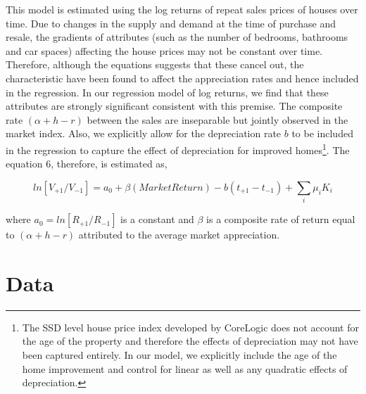 \documentclass[AEJ,reqno, draftmode]{AEA} %
\begin{document}
This model is estimated using the log returns of repeat sales prices of houses over time. Due to changes in the supply and demand at the time of purchase and resale, the gradients of attributes (such as the number of bedrooms, bathrooms and car spaces) affecting the house prices may not be constant over time. Therefore, although the equations suggests that these cancel out, the characteristic have been found to affect the appreciation rates \citep{kiel1995effect} and hence included in the regression. In our regression model of log returns, we find that these attributes are strongly significant consistent with this premise. The composite rate $(\alpha+h-r)$ between the sales are inseparable but jointly observed in the market index. Also, we explicitly allow for the depreciation rate $b$ to be included in the regression to capture the effect of depreciation for improved homes\footnote{The SSD level house price index developed by CoreLogic does not account for the age of the property and therefore the effects of depreciation may not have been captured entirely. In our model, we explicitly include the age of the home improvement and control for linear as well as any quadratic effects of depreciation.}. The equation 6, therefore, is estimated as,

\begin{equation} \label{eq:estimate}
    ln[V_{+1}/V_{-1}] = a_0 + \beta{(Market Return)} - b(t_{+1}-t_{-1}) + \sum_{i}\mu_i K_i
\end{equation}

where $a_0 = ln[R_{+1}/R_{-1}]$ is a constant and $\beta$ is a composite rate of return equal to $(\alpha+h-r)$ attributed to the average market appreciation.


\section{Data}
\end{document}
